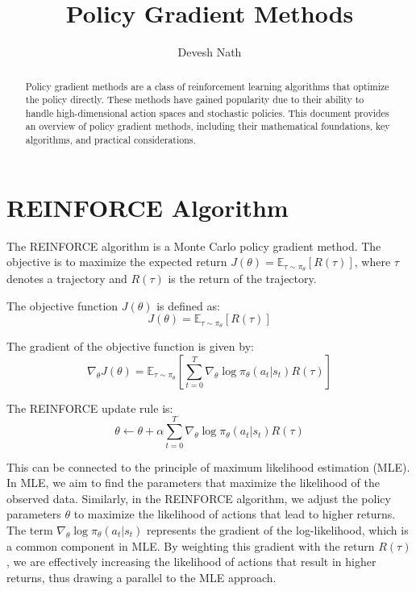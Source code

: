 \documentclass[12pt]{article}
\begin{document}
\title{Policy Gradient Methods}
\author{Devesh Nath}

\maketitle

\begin{abstract}
Policy gradient methods are a class of reinforcement learning algorithms that optimize the policy directly. These methods have gained popularity due to their ability to handle high-dimensional action spaces and stochastic policies. This document provides an overview of policy gradient methods, including their mathematical foundations, key algorithms, and practical considerations.
\end{abstract}

\section{REINFORCE Algorithm}

The REINFORCE algorithm is a Monte Carlo policy gradient method. The objective is to maximize the expected return \( J(\theta) = \mathbb{E}_{\tau \sim \pi_\theta} [R(\tau)] \), where \( \tau \) denotes a trajectory and \( R(\tau) \) is the return of the trajectory.

The objective function \( J(\theta) \) is defined as:
\[ 
J(\theta) = \mathbb{E}_{\tau \sim \pi_\theta} [R(\tau)] 
\]

The gradient of the objective function is given by:
\[
\nabla_\theta J(\theta) = \mathbb{E}_{\tau \sim \pi_\theta} \left[ \sum_{t=0}^{T} \nabla_\theta \log \pi_\theta(a_t | s_t) R(\tau) \right]
\]

The REINFORCE update rule is:
\[
\theta \leftarrow \theta + \alpha \sum_{t=0}^{T} \nabla_\theta \log \pi_\theta(a_t | s_t) R(\tau)
\]

This can be connected to the principle of maximum likelihood estimation (MLE). In MLE, we aim to find the parameters that maximize the likelihood of the observed data. Similarly, in the REINFORCE algorithm, we adjust the policy parameters \( \theta \) to maximize the likelihood of actions that lead to higher returns. The term \( \nabla_\theta \log \pi_\theta(a_t | s_t) \) represents the gradient of the log-likelihood, which is a common component in MLE. By weighting this gradient with the return \( R(\tau) \), we are effectively increasing the likelihood of actions that result in higher returns, thus drawing a parallel to the MLE approach.
\end{document}
